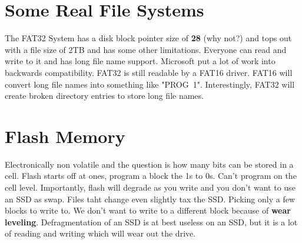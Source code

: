 \documentclass[../base_file/cs1550_notes.tex]{subfiles}
\begin{document}
\section{Some Real File Systems}
The FAT32 System has a disk block pointer size of \textbf{28} (why not?) and tops
out with a file size of 2TB and has some other limitations.  Everyone can read
and write to it and has long file name support.  Microsoft put a lot of work into
backwards compatibility.  FAT32 is still readable by a FAT16 driver.  FAT16 will
convert long file names into something like "PROG~1".  Interestingly, FAT32 will
create broken directory entries to store long file names.
\section{Flash Memory}
Electronically non volatile and the question is how many bits can be stored
in a cell.  Flash starts off at ones, program a block the 1s to 0s.  Can't
program on the cell level.  Importantly, flash will degrade as you write and
you don't want to use an SSD as swap.  Files taht change even slightly tax the SSD.
Picking only a few blocks to write to.  We don't want to write to a different
block because of \textbf{wear leveling}.  Defragmentation of an SSD is at best
useless on an SSD, but it is a lot of reading and writing which will wear 
out the drive.  
\end{document}
